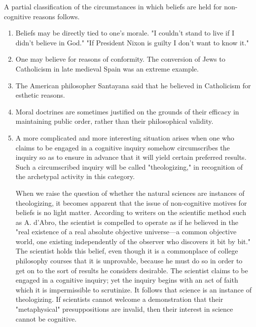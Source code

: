 \documentclass[10pt,twoside]{memoir}
\begin{document}
\begin{enumerate}
A partial classification of the circumstances in which beliefs are held for 
non-cognitive reasons follows. 

\begin{enumerate}
\item Beliefs may be directly tied to one's morale. "I couldn't stand to live if I didn't believe in God." "If President Nixon is guilty I don't want to know it." 

\item One may believe for reasons of conformity. The conversion of Jews to Catholicism in late medieval Spain was an extreme example. 

\item The American philosopher Santayana said that he believed in Catholicism for esthetic reasons. 

\item Moral doctrines are sometimes justified on the grounds of their efficacy in maintaining public order, rather than their philosophical validity. 

\item A more complicated and more interesting situation arises when one 
who claims to be engaged in a cognitive inquiry somehow circumscribes the 
inquiry so as to ensure in advance that it will yield certain preferred results. 
Such a circumscribed inquiry will be called "theologizing," in recognition of 
the archetypal activity in this category. 

When we raise the question of whether the natural sciences are 
instances of theologizing, it becomes apparent that the issue of non-cognitive 
motives for beliefs is no light matter. According to writers on the scientific 
method such as A. d'Abro, the scientist is compelled to operate as if he 
believed in the "real existence of a real absolute objective universe---a 
common objective world, one existing independently of the observer who 
discovers it bit by bit." The scientist holds this belief, even though it is a 
commonplace of college philosophy courses that it is unprovable, because he 
must do so in order to get on to the sort of results he considers desirable. 
The scientist claims to be engaged in a cognitive inquiry; yet the inquiry 
begins with an act of faith which it is impermissible to scrutinize. It follows 
that science is an instance of theologizing. If scientists cannot welcome a 
demonstration that their "metaphysical" presuppositions are invalid, then 
their interest in science cannot be cognitive. 


\end{enumerate}
\end{enumerate}
\end{document}

